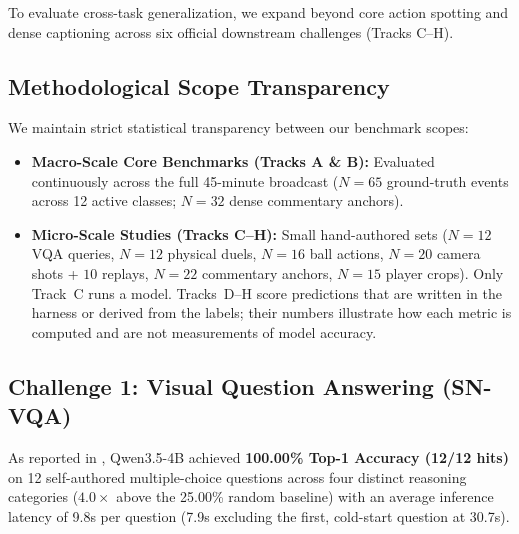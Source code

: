 \documentclass[10pt,twocolumn,letterpaper]{article}
\begin{document}
To evaluate cross-task generalization, we expand beyond core action spotting and dense captioning across six official downstream challenges (Tracks C--H).

\subsection{Methodological Scope Transparency}
We maintain strict statistical transparency between our benchmark scopes:
\begin{itemize}
    \item \textbf{Macro-Scale Core Benchmarks (Tracks A \& B):} Evaluated continuously across the full 45-minute broadcast ($N=65$ ground-truth events across 12 active classes; $N=32$ dense commentary anchors).
    \item \textbf{Micro-Scale Studies (Tracks C--H):} Small hand-authored sets ($N=12$ VQA queries, $N=12$ physical duels, $N=16$ ball actions, $N=20$ camera shots + $10$ replays, $N=22$ commentary anchors, $N=15$ player crops). Only Track~C runs a model. Tracks~D--H score predictions that are written in the harness or derived from the labels; their numbers illustrate how each metric is computed and are not measurements of model accuracy.
\end{itemize}

\subsection{Challenge 1: Visual Question Answering (SN-VQA)}
As reported in , Qwen3.5-4B achieved \textbf{100.00\% Top-1 Accuracy (12/12 hits)} on 12 self-authored multiple-choice questions across four distinct reasoning categories ($4.0\times$ above the 25.00\% random baseline) with an average inference latency of 9.8s per question (7.9s excluding the first, cold-start question at 30.7s).

\begin{table}[h]
\centering
\small
\caption{\textbf{Track C SoccerNet Visual Question Answering (SN-VQA).}}
\label{tab:vqa_results}
\end{table}
\end{document}
